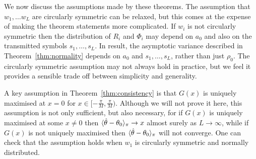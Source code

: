 \documentclass{article}
\begin{document}
We now discuss the assumptions made by these theorems.  The assumption that $w_1, \dots w_L$ are circularly symmetric can be relaxed, but this comes at the expense of making the theorem statements more complicated.  If $w_i$ is not circularly symmetric then the distribution of $R_i$ and $\Phi_i$ may depend on $a_0$ and also on the transmitted symbols $s_1, \dots, s_L$.  In result, the asymptotic variance described in Theorem~\ref{thm:normality} depends on $a_0$ and $s_1, \dots, s_L$, rather than just $\rho_0$.  The circularly symmetric assumption may not always hold in practice, but we feel it provides a sensible trade off between simplicity and generality.

A key assumption in Theorem~\ref{thm:consistency} is that $G(x)$ is uniquely maximised at $x = 0$ for $x \in [-\tfrac{\pi}{M},\tfrac{\pi}{M})$.  %
Although we will not prove it here, this assumption is not only sufficient, but also necessary, for if $G(x)$ is uniquely maximised at some $x \neq 0$ then $\langle \hat{\theta} - \theta_0 \rangle_\pi \rightarrow x$ almost surely as $L\rightarrow\infty$, while if $G(x)$ is not uniquely maximised then $\langle \hat{\theta} - \theta_0 \rangle_\pi$ will not converge.  One can check that the assumption holds when $w_1$ is circularly symmetric and normally distributed.  %

\end{document}
